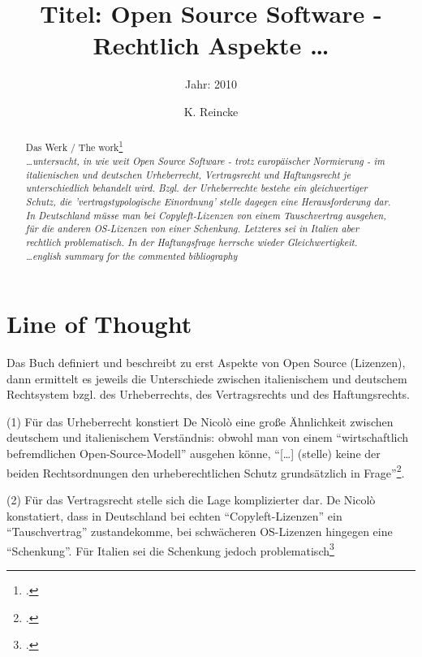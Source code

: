 \documentclass[DIV=calc,BCOR=5mm,11pt,headings=small,oneside,abstract=true, toc=bib]{scrartcl}
\begin{document}

\titlehead{Literaturexzerpt}
\subject{Autor(en): De Nicolò}
\title{Titel: Open Source Software - Rechtlich Aspekte \ldots}
\subtitle{Jahr: 2010 }
\author{K. Reincke}

\maketitle

\begin{abstract}
\noindent
Das Werk / The work\footcite[][]{DeNicolo2010a} \\
\noindent \itshape
\ldots untersucht, in wie weit Open Source Software - trotz europäischer
Normierung - im italienischen und deutschen Urheberrecht, Vertragsrecht und
Haftungsrecht je unterschiedlich behandelt wird. Bzgl. der Urheberrechte bestehe
ein gleichwertiger Schutz, die 'vertragstypologische Einordnung' stelle dagegen
eine Herausforderung dar. In Deutschland müsse man bei Copyleft-Lizenzen von
einem Tauschvertrag ausgehen, für die anderen OS-Lizenzen von einer Schenkung.
Letzteres sei in Italien aber rechtlich problematisch. In der Haftungsfrage
herrsche wieder Gleichwertigkeit. \\
\noindent
\ldots english summary for the commented bibliography
\end{abstract}
\footnotesize
\normalsize

\section{Line of Thought}
Das Buch definiert und beschreibt zu erst Aspekte von Open Source (Lizenzen),
dann ermittelt es jeweils die Unterschiede zwischen italienischem und deutschem
Rechtsystem bzgl. des Urheberrechts, des Vertragsrechts und des Haftungsrechts.

(1) Für das Urheberrecht konstiert De Nicolò eine große Ähnlichkeit zwischen
deutschem und italienischem Verständnis: obwohl man von einem
\enquote{wirtschaftlich befremdlichen Open-Source-Modell} ausgehen könne,
\enquote{[\ldots] (stelle) keine der beiden Rechtsordnungen den urheberechtlichen
Schutz grundsätzlich in Frage}\footcite[vgl.][98]{DeNicolo2010a}.

(2) Für das Vertragsrecht stelle sich die Lage komplizierter dar. De Nicolò
konstatiert, dass in Deutschland bei echten \enquote{Copyleft-Lizenzen} ein
\enquote{Tauschvertrag} zustandekomme, bei schwächeren OS-Lizenzen hingegen
eine \enquote{Schenkung}. Für Italien sei die Schenkung jedoch
problematisch\footcite[vgl.][144]{DeNicolo2010a}
\end{document}
